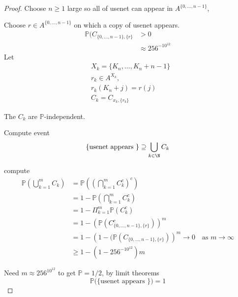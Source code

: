 \begin{proof}
	Choose $n \geq 1$ large so all of usenet can appear in $A ^{\{0,\ldots,n-1\}}$,

	Choose  $r \in A^{\{0,\ldots,n-1\}} $ on which a copy of usenet appears.
	\begin{align*}
		\mathbb{P}(C_{\{0,\ldots, n-1\}, \{r\}} &> 0 \\
												&\approx 256^{-10^{12}}
	\end{align*}
	Let
	\begin{align*}
		&X_k = \{ K_n, \ldots, K_n + n-1 \} \\
		&r_k \in A^{X_k}, \\
		&r_k(K_n + j) = r(j) \\
		&C_k = C_{x_k, \{r_k\}}
	\end{align*}
	
	The $C_k$ are $\mathbb{P}$-independent.

	Compute event 
	\[
		\{\text{usenet appears \}} \contains \bigcup_{k \in \N} C_k
	\] 
	 
	compute
	\begin{align*}
		\mathbb{P}( \bigcup_{k=1}^{m} C_k ) &= \mathbb{P}((\bigcap_{k=1}^{m} C_{k}^c )^c) \\
											&= 1 - \mathbb{P} ( \bigcap_{k=1}^{m} C_{k}^c ) \\
											&= 1 - \Pi_{k=1}^{m} \mathbb{P}(C_k^c) \\
											&= 1 - \left(\mathbb{P}(C^c_{\{0, \ldots, n-1\}, \{r\}})\right)^m \\
											&= 1 - \left(1 - (\mathbb{P}(C_{\{0, \ldots, n-1\}, \{r\}})\right)^m \to 0 \quad \text{as } m\to \infty \\
											&\geq 1 - (1 - 256^{-10^12})m
	\end{align*} 

	Need $m \approx 256^{10^{12}}$ to get $\mathbb{P} = 1/2$, by limit theorems
	\[
		\mathbb{P}(\{\text{usenet appears \})} = 1
	\] 
\end{proof}


